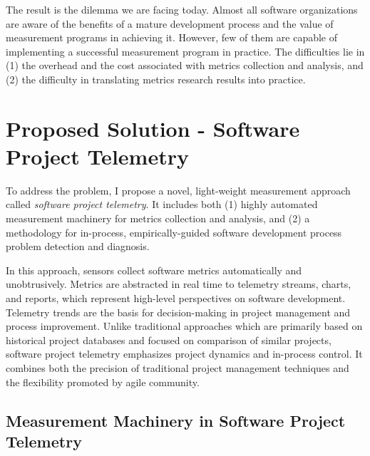 The result is the dilemma we are facing today. Almost all software organizations are aware of the benefits of a mature development process and the value of measurement programs in achieving it. However, few of them are capable of implementing a successful measurement program in practice. The difficulties lie in (1) the overhead and the cost associated with metrics collection and analysis, and (2) the difficulty in translating metrics research results into practice.






\section{Proposed Solution - Software Project Telemetry}  \label{Intro:Solution}

To address the problem, I propose a novel, light-weight measurement approach called \textit{software project telemetry}. It includes both (1) highly automated measurement machinery for metrics collection and analysis, and (2) a methodology for in-process, empirically-guided software development process problem detection and diagnosis. 

In this approach, sensors collect software metrics automatically and unobtrusively. Metrics are abstracted in real time to telemetry streams, charts, and reports, which represent high-level perspectives on software development. Telemetry trends are the basis for decision-making in project management and process improvement. Unlike traditional approaches which are primarily based on historical project databases and focused on comparison of similar projects, software project telemetry emphasizes project dynamics and in-process control. It combines both the precision of traditional project management techniques and the flexibility promoted by agile community.






\subsection{Measurement Machinery in Software Project Telemetry}
\label{Intro:Solution:MeasurementMachinery}

